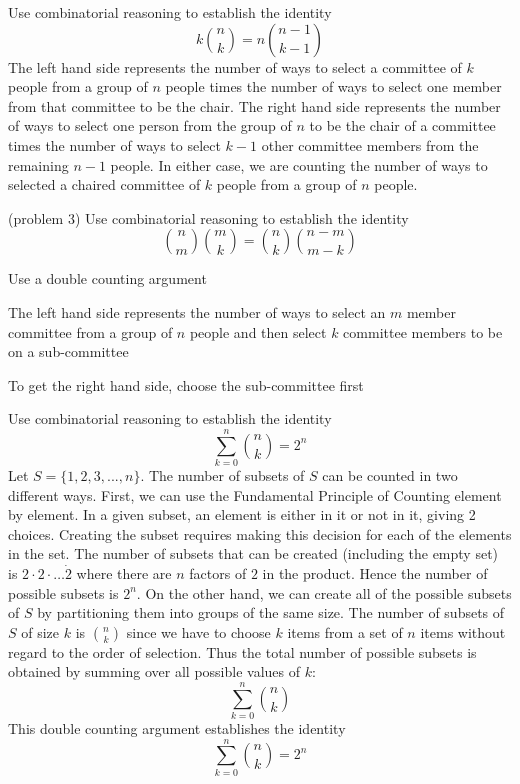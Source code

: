 \documentclass[handout]{ximera}
\begin{document}
\begin{example}[example 3]
Use combinatorial reasoning to establish the identity
\[
k \binom{n}{k} = n\binom{n-1}{k-1}
\]
The left hand side represents the number of ways to select a committee of $k$ people from a group 
of $n$ people times the number of ways to select one member from that committee to be the chair. 
The right hand side represents the number of ways to select one person from the group of $n$ to be the 
chair of a committee times the number of ways to select $k-1$ other committee members from 
the remaining $n-1$ people.  In either case, we are counting the number of ways to selected 
a chaired committee of $k$ people from a group of $n$ people.
\end{example}

\begin{problem}(problem 3)
Use combinatorial reasoning to establish the identity
\[
\binom{n}{m} \binom{m}{k} = \binom{n}{k} \binom{n-m}{m-k}
\]
\begin{hint}
Use a double counting argument
\end{hint}
\begin{hint}
The left hand side represents the number of ways to select an $m$ member committee from a group of $n$ people and then 
select $k$ committee members to be on a sub-committee
\end{hint}

\begin{hint}
To get the right hand side, choose the sub-committee first
\end{hint}
\end{problem}

\begin{example}[example 4]
Use combinatorial reasoning to establish the identity
\[
\sum_{k=0}^n \binom{n}{k} = 2^n
\]
Let $S = \{1,2,3,...,n\}$. The number of subsets of $S$ can be counted in two different ways.
First, we can use the Fundamental Principle of Counting element by element. 
In a given subset, an element is either in it or not in it, giving 2 choices. 
Creating the subset requires making this decision for each of the elements in the set. 
The number of subsets that can be created (including the empty set) 
is $2 \cdot 2 \cdot \ldots \dot 2$ where there are $n$ factors of $2$ in the product.  
Hence the number of possible subsets is $2^n$.
On the other hand, we can create all of the possible subsets of $S$ by partitioning them 
into groups of the same size.
The number of subsets of $S$ of size $k$ is $\binom{n}{k}$ since we have to choose $k$ items from a 
set of $n$ items without regard to the order of selection. Thus the total number of possible 
subsets is obtained by summing over all possible values of $k$:
\[
\sum_{k=0}^n \binom{n}{k}
\]
This double counting argument establishes the identity
\[
\sum_{k=0}^n \binom{n}{k} = 2^n
\]

\end{example}
\end{document}
